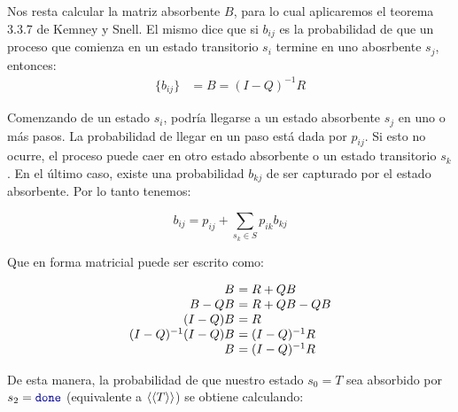Nos resta calcular la matriz absorbente $B$, para lo cual aplicaremos el
teorema 3.3.7 de Kemney y Snell. El mismo
dice que si $b_{ij}$ es la probabilidad de que un proceso que comienza en un
estado transitorio $s_i$ termine en uno abosrbente $s_j$, entonces:
\begin{align*}
	\{b_{ij}\} & = B = (I - Q)^{-1}R
\end{align*}

Comenzando de un estado $s_i$, podría llegarse a un estado absorbente $s_j$ en
uno o más pasos. La probabilidad de llegar en un paso está dada por $p_{ij}$.
Si esto no ocurre, el proceso puede caer en otro estado absorbente o un estado
transitorio $s_k$. En el último caso, existe una probabilidad $b_{kj}$ de ser
capturado por el estado absorbente. Por lo tanto tenemos:

\begin{equation*}
	b_{ij} = p_{ij} + \sum_{s_k \in S} p_{ik} b_{kj}
\end{equation*}

Que en forma matricial puede ser escrito como:

\[
\begin{array}{r@{\ }l}
	B & = R + QB \\
	B - QB & = R + QB -QB \\
	(I - Q)B & = R \\
	(I - Q)^{-1}(I - Q)B & = (I - Q)^{-1}R \\
	B & = (I - Q)^{-1}R
\end{array}
\]

De esta manera, la probabilidad de que nuestro estado $s_0 = T$ sea absorbido por
$s_2 = \Done$ (equivalente a $\langle\langle T\rangle\rangle$) se obtiene calculando:

